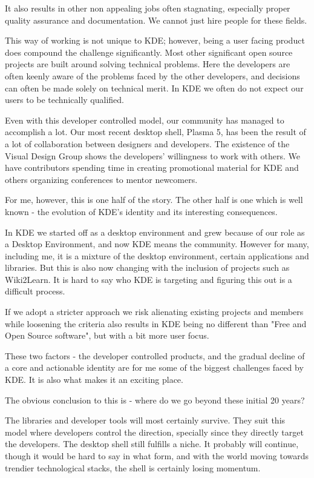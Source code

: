 It also results in other non appealing jobs often stagnating, especially proper quality assurance and documentation. We cannot just hire people for these fields.

This way of working is not unique to KDE; however, being a user facing product does compound the challenge significantly. Most other significant open source projects are built around solving technical problems. Here the developers are often keenly aware of the problems faced by the other developers, and decisions can often be made solely on technical merit. In KDE we often do not expect our users to be technically qualified.

Even with this developer controlled model, our community has managed to accomplish a lot. Our most recent desktop shell, Plasma 5, has been the result of a lot of collaboration between designers and developers. The existence of the Visual Design Group shows the developers' willingness to work with others. We have contributors spending time in creating promotional material for KDE and others organizing conferences to mentor newcomers.

For me, however, this is one half of the story. The other half is one which is well known - the evolution of KDE's identity and its interesting consequences.

In KDE we started off as a desktop environment and grew because of our role as a Desktop Environment, and now KDE means the community. However for many, including me, it is a mixture of the desktop environment, certain applications and libraries. But this is also now changing with the inclusion of projects such as Wiki2Learn. It is hard to say who KDE is targeting and figuring this out is a difficult process.

If we adopt a stricter approach we risk alienating existing projects and members while loosening the criteria also results in KDE being no different than "Free and Open Source software", but with a bit more user focus. 

These two factors - the developer controlled products, and the gradual decline of a core and actionable identity are for me some of the biggest challenges faced by KDE. It is also what makes it an exciting place.

The obvious conclusion to this is - where do we go beyond these initial 20 years?

The libraries and developer tools will most certainly survive. They suit this model where developers control the direction, specially since they directly target the developers. The desktop shell still fulfills a niche. It probably will continue, though it would be hard to say in what form, and with the world moving towards trendier technological stacks, the shell is certainly losing momentum.

